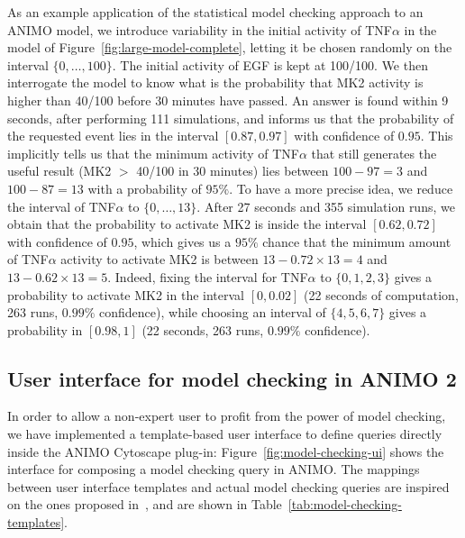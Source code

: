 \documentclass{bmcart}
\def\animo2{ANIMO 2}
\begin{document}
As an example application of the statistical model checking
approach to an ANIMO model, we introduce variability in the initial activity of TNF$\alpha$
in the model of Figure~\ref{fig:large-model-complete}, letting it be chosen randomly on the interval $\{0, \dots, 100\}$.
The initial activity of EGF is kept at 100/100.
We then interrogate the model to know what is the probability that MK2 activity is higher than 40/100 before 30 minutes
have passed. An answer is found within 9 seconds, after performing 111 simulations,
and informs us that the probability of the requested event lies in the interval $[0.87, 0.97]$ with confidence of $0.95$.
This implicitly tells us that the minimum activity of TNF$\alpha$ that still generates the useful result (MK2 $>$ 40/100
in 30 minutes) lies between $100-97 = 3$ and $100-87 = 13$ with a probability of $95\%$.
To have a more precise idea, we reduce the interval of TNF$\alpha$ to $\{0, \dots, 13\}$. After 27 seconds and 355 simulation runs,
we obtain that the probability to activate MK2 is inside the interval $[0.62, 0.72]$ with confidence of $0.95$, which gives
us a $95\%$ chance that the minimum amount of TNF$\alpha$ activity to activate MK2 is between $13 - 0.72 \times 13 = 4$
and $13 - 0.62 \times 13 = 5$. Indeed, fixing the interval for TNF$\alpha$ to $\{0, 1, 2, 3\}$ gives a probability
to activate MK2 in the interval $[0, 0.02]$ (22 seconds of computation, 263 runs, $0.99\%$ confidence), while choosing an interval of $\{4, 5, 6, 7 \}$
gives a probability in $[0.98,1]$ (22 seconds, 263 runs, $0.99\%$ confidence).



\subsection*{User interface for model checking in \animo2{}}\label{sec:animo-model-checking-ui}
In order to allow a non-expert user to profit from the power of model checking, we have implemented
a template-based user interface to define queries directly inside the ANIMO Cytoscape plug-in:
Figure~\ref{fig:model-checking-ui} shows the interface for composing a model checking query in ANIMO.
The mappings between user interface templates and actual model checking queries are inspired
on the ones proposed in~\cite{hidde-templates}, and are shown in Table~\ref{tab:model-checking-templates}.
\end{document}
